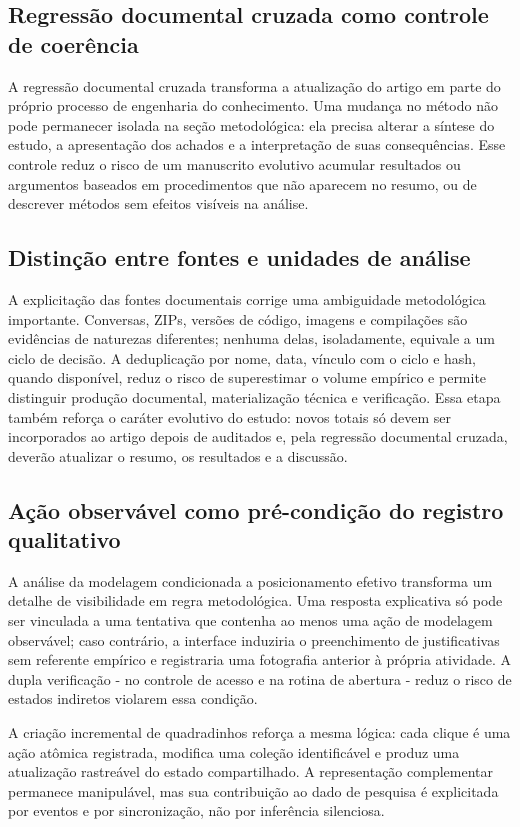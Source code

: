 \documentclass[preprint,12pt,authoryear]{elsarticle}
\begin{document}
\subsection{Regressão documental cruzada como controle de coerência}
A regressão documental cruzada transforma a atualização do artigo em parte do próprio processo de engenharia do conhecimento. Uma mudança no método não pode permanecer isolada na seção metodológica: ela precisa alterar a síntese do estudo, a apresentação dos achados e a interpretação de suas consequências. Esse controle reduz o risco de um manuscrito evolutivo acumular resultados ou argumentos baseados em procedimentos que não aparecem no resumo, ou de descrever métodos sem efeitos visíveis na análise.

\subsection{Distinção entre fontes e unidades de análise}
A explicitação das fontes documentais corrige uma ambiguidade metodológica importante. Conversas, ZIPs, versões de código, imagens e compilações são evidências de naturezas diferentes; nenhuma delas, isoladamente, equivale a um ciclo de decisão. A deduplicação por nome, data, vínculo com o ciclo e hash, quando disponível, reduz o risco de superestimar o volume empírico e permite distinguir produção documental, materialização técnica e verificação. Essa etapa também reforça o caráter evolutivo do estudo: novos totais só devem ser incorporados ao artigo depois de auditados e, pela regressão documental cruzada, deverão atualizar o resumo, os resultados e a discussão.

\subsection{Ação observável como pré-condição do registro qualitativo}
A análise da modelagem condicionada a posicionamento efetivo transforma um detalhe de visibilidade em regra metodológica. Uma resposta explicativa só pode ser vinculada a uma tentativa que contenha ao menos uma ação de modelagem observável; caso contrário, a interface induziria o preenchimento de justificativas sem referente empírico e registraria uma fotografia anterior à própria atividade. A dupla verificação - no controle de acesso e na rotina de abertura - reduz o risco de estados indiretos violarem essa condição.

A criação incremental de quadradinhos reforça a mesma lógica: cada clique é uma ação atômica registrada, modifica uma coleção identificável e produz uma atualização rastreável do estado compartilhado. A representação complementar permanece manipulável, mas sua contribuição ao dado de pesquisa é explicitada por eventos e por sincronização, não por inferência silenciosa.
\end{document}
